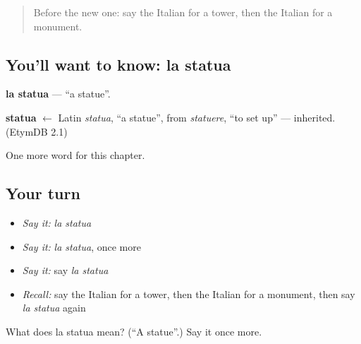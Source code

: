 \label{lesson:IT-C228-statua}



\begin{quote}
Before the new one: say the Italian for a tower, then the Italian for a monument.
\end{quote}

\subsection*{You'll want to know: la statua}
\textbf{la statua} — \textquotedblleft{}a statue\textquotedblright{}.

\begin{cousinweb}
\textbf{statua} $\leftarrow$ Latin \emph{statua}, \textquotedblleft{}a statue\textquotedblright{}, from \emph{statuere}, \textquotedblleft{}to set up\textquotedblright{} — inherited. (EtymDB 2.1)
\end{cousinweb}

\begin{grammarlens}[title={What you've built}]
One more word for this chapter.
\end{grammarlens}

\subsection*{Your turn}
\begin{itemize}
\raggedright
  \item \emph{Say it:} \emph{la statua}
  \item \emph{Say it:} \emph{la statua}, once more
  \item \emph{Say it:} say \emph{la statua}
  \item \emph{Recall:} say the Italian for a tower, then the Italian for a monument, then say \emph{la statua} again
\end{itemize}

\begin{tcolorbox}[breakable,colback=teal!4,colframe=teal!35!black,title={Before you move on}]
What does la statua mean? (\textquotedblleft{}A statue\textquotedblright{}.) Say it once more.
\end{tcolorbox}
